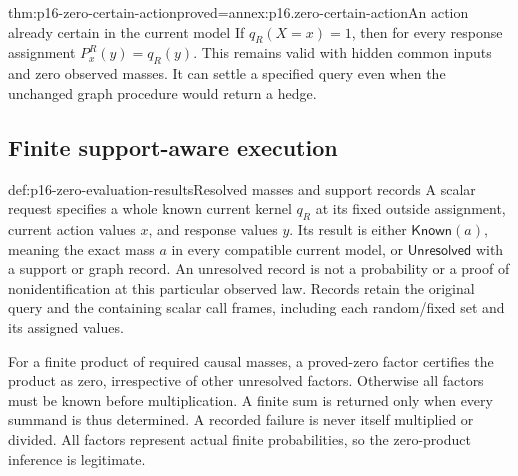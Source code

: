 \begin{hbtheorem}{thm:p16-zero-certain-action}{proved=annex:p16.zero-certain-action}{An action already certain in the current model}
If \(q_R(X=x)=1\), then for every response assignment
\(P^R_x(y)=q_R(y)\). This remains valid with hidden common
inputs and zero observed masses. It can settle a specified query
even when the unchanged graph procedure would return a hedge.
\end{hbtheorem}

\subsection{Finite support-aware execution}

\begin{hbdefinition}{def:p16-zero-evaluation-results}{Resolved masses and support records}
A scalar request specifies a whole known current kernel \(q_R\)
at its fixed outside assignment, current action values \(x\), and
response values \(y\). Its result is either \(\mathsf{Known}(a)\),
meaning the exact mass \(a\) in every compatible current model,
or \(\mathsf{Unresolved}\) with a support or graph record.
An unresolved record is not a probability or a proof of nonidentification
at this particular observed law.
Records retain the original query and the containing scalar call frames,
including each random/fixed set and its assigned values.

For a finite product of required causal masses, a proved-zero factor
certifies the product as zero, irrespective of other unresolved factors.
Otherwise all factors must be known before multiplication. A finite
sum is returned only when every summand is thus determined. A recorded
failure is never itself multiplied or divided. All factors represent
actual finite probabilities, so the zero-product inference is legitimate.
\end{hbdefinition}

